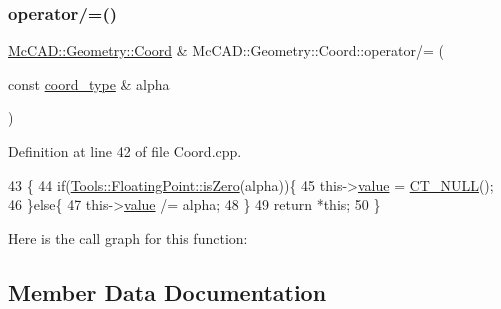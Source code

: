 \mbox{\label{classMcCAD_1_1Geometry_1_1Coord_a8fa792d0eb4c3faed3eb0742dedfd55f}} 
\subsubsection{\texorpdfstring{operator/=()}{operator/=()}\hspace{0.1cm}{\footnotesize\ttfamily [2/2]}}
{\footnotesize\ttfamily \hyperlink{classMcCAD_1_1Geometry_1_1Coord}{Mc\+C\+A\+D\+::\+Geometry\+::\+Coord} \& Mc\+C\+A\+D\+::\+Geometry\+::\+Coord\+::operator/= (\begin{DoxyParamCaption}\item[{const \hyperlink{namespaceMcCAD_1_1Geometry_ac043b37a4a7e849fca22869e1982d2f8}{coord\+\_\+type} \&}]{alpha }\end{DoxyParamCaption})}



Definition at line 42 of file Coord.\+cpp.


\begin{DoxyCode}
43                                 \{
44     \textcolor{keywordflow}{if}(\hyperlink{namespaceMcCAD_1_1Tools_1_1FloatingPoint_a10fd15c76eb2901c2983aabad531d731}{Tools::FloatingPoint::isZero}(alpha))\{
45         this->\hyperlink{classMcCAD_1_1Geometry_1_1Coord_a540aea93d3b1a9cfd505e1e0b96b2b91}{value} = \hyperlink{namespaceMcCAD_1_1Geometry_a7a1a1f1e3e0547cde4d81dec1a126c28}{CT\_NULL}();
46     \}\textcolor{keywordflow}{else}\{
47         this->\hyperlink{classMcCAD_1_1Geometry_1_1Coord_a540aea93d3b1a9cfd505e1e0b96b2b91}{value} /= alpha;
48     \}
49     \textcolor{keywordflow}{return} *\textcolor{keyword}{this};
50 \}
\end{DoxyCode}
Here is the call graph for this function\+:


\subsection{Member Data Documentation}
\mbox{\label{classMcCAD_1_1Geometry_1_1Coord_a540aea93d3b1a9cfd505e1e0b96b2b91}} 
